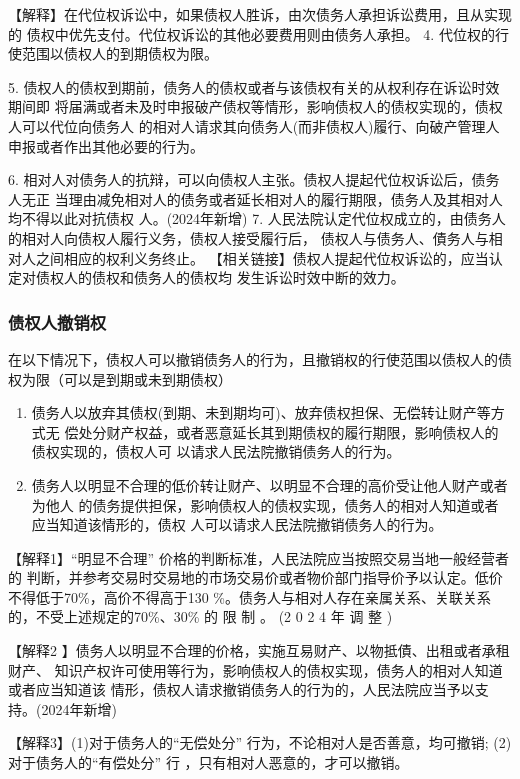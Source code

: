 \documentclass[UTF8,12pt]{ctexart}
\numberwithin{equation}{section} %
\numberwithin{figure}{section}
\numberwithin{table}{section}
\begin{document}
	
	【解释】在代位权诉讼中，如果债权人胜诉，由次债务人承担诉讼费用，且从实现的 债权中优先支付。代位权诉讼的其他必要费用则由债务人承担。
	4. 代位权的行使范围以债权人的到期债权为限。
	
	5. 债权人的债权到期前，债务人的债权或者与该债权有关的从权利存在诉讼时效期间即 将届满或者未及时申报破产债权等情形，影响债权人的债权实现的，债权人可以代位向债务人 的相对人请求其向债务人(而非债权人)履行、向破产管理人申报或者作出其他必要的行为。 
	
	6. 相对人对债务人的抗辩，可以向债权人主张。债权人提起代位权诉讼后，债务人无正 当理由减免相对人的债务或者延长相对人的履行期限，债务人及其相对人均不得以此对抗债权 人。(2024年新增)
	7. 人民法院认定代位权成立的，由债务人的相对人向债权人履行义务，债权人接受履行后， 债权人与债务人、債务人与相对人之间相应的权利义务终止。
	【相关链接】债权人提起代位权诉讼的，应当认定对债权人的债权和债务人的债权均 发生诉讼时效中断的效力。
	
	\subsubsection{债权人撤销权}
	在以下情况下，债权人可以撤销债务人的行为，且撤销权的行使范围以债权人的债权为限（可以是到期或未到期债权）
	\begin{enumerate}
		\item 债务人以放弃其债权(到期、未到期均可)、放弃债权担保、无偿转让财产等方式无 偿处分财产权益，或者恶意延长其到期债权的履行期限，影响债权人的债权实现的，债权人可 以请求人民法院撤销债务人的行为。
		
		\item 债务人以明显不合理的低价转让财产、以明显不合理的高价受让他人财产或者为他人 的债务提供担保，影响债权人的债权实现，债务人的相对人知道或者应当知道该情形的，债权 人可以请求人民法院撤销债务人的行为。
	\end{enumerate}
	
	【解释1】“明显不合理” 价格的判断标准，人民法院应当按照交易当地一般经营者的 判断，并参考交易时交易地的市场交易价或者物价部门指导价予以认定。低价不得低于70\%，高价不得高于130 \%。债务人与相对人存在亲属关系、关联关系的，不受上述规定的70\%、30\% 的 限 制 。 (2 0 2 4 年 调 整 )
	
	【解释2 】债务人以明显不合理的价格，实施互易财产、以物抵債、出租或者承租财产、 知识产权许可使用等行为，影响债权人的债权实现，债务人的相对人知道或者应当知道该 情形，债权人请求撤销债务人的行为的，人民法院应当予以支持。(2024年新增) 
	
	【解释3】(1)对于债务人的“无偿处分” 行为，不论相对人是否善意，均可撤销; (2)对于债务人的“有偿处分” 行 ，只有相对人恶意的，才可以撤销。
	
\end{document}
